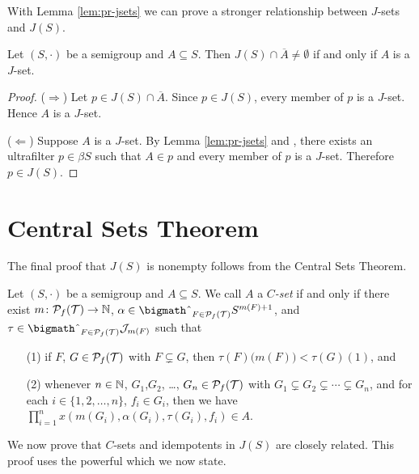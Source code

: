 With Lemma \ref{lem:pr-jsets} we can prove a stronger relationship between $J$-sets and $J(S)$.

\begin{thm}
  \label{thm:jsets-ideal}
  Let $(S, \cdot)$ be a semigroup and $A \subseteq S$.
  Then $J(S) \cap \overline{A} \ne \emptyset$ if and only if $A$ is a $J$-set.
\end{thm}
\begin{proof}
  ($\Rightarrow$)
  Let $p \in J(S) \cap \overline{A}$. 
  Since $p \in J(S)$, every member of $p$ is a $J$-set.
  Hence $A$ is a $J$-set.

  ($\Leftarrow$)
  Suppose $A$ is a $J$-set. 
  By Lemma \ref{lem:pr-jsets} and \cite[Theorem 3.11]{Hindman:1998fk}, there exists an ultrafilter $p \in \beta S$ such that $A \in p$ and every member of $p$ is a $J$-set. 
  Therefore $p \in J(S)$.
\end{proof}


\section{Central Sets Theorem}
The final proof that $J(S)$ is nonempty follows from the Central Sets Theorem.
\begin{defn}
  \label{defn:csets}
  Let $(S, \cdot)$ be a semigroup and $A \subseteq S$.
  We call $A$ a \textsl{$C$-set} if and only if there exist $m \colon \mathcal{P}_f(\mathcal{T}) \to \mathbb{N}$, $\alpha \in \bigtimes_{F \in \Pf(\calT)} S^{m(F)+1}$, and $\tau \in \bigtimes_{F \in \Pf(\calT)} \calJ_{m(F)}$ such that 
  \begin{itemize}
    \item[(1)] if $F$, $G \in \mathcal{P}_f(\mathcal{T})$ with $F \subsetneq G$, then $\tau(F)\bigl( m(F) \bigr) < \tau(G)(1)$, and
    \item[(2)] whenever $n \in \mathbb{N}$, $G_1$,$G_2$, \dots, $G_n \in \mathcal{P}_f(\mathcal{T})$  with $G_1 \subsetneq G_2 \subsetneq \cdots \subsetneq G_n$, and for each $i \in \{1, 2, \ldots, n\}$, $f_i \in G_i$, then we have $\prod_{i=1}^n x(m(G_i), \alpha(G_i), \tau(G_i), f_i) \in A$.
  \end{itemize}
\end{defn}

We now prove that $C$-sets and idempotents in $J(S)$ are closely related.
This proof uses the powerful \cite[Lemma 14.9]{Hindman:1998fk} which we now state.

